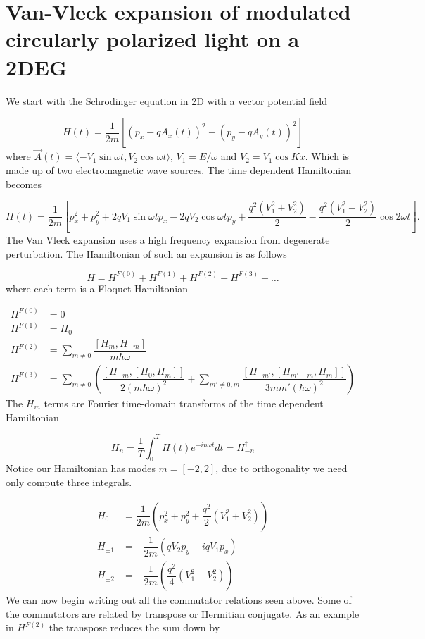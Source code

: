 \section{Van-Vleck expansion of modulated circularly polarized light on a 2DEG}

We start with the Schrodinger equation in 2D with a vector potential field

\begin{equation}
  H(t) = \dfrac{1}{2m} \left[ (p_x - qA_x(t))^2 + (p_y - qA_y(t))^2 \right]
\end{equation}
where $\vec{A}(t) = \langle -V_1\sin{\omega t} , V_2\cos{\omega t} \rangle$, $V_1 = E/\omega$ and $V_2 = V_1 \cos{Kx}$.
Which is made up of two electromagnetic wave sources.
The time dependent Hamiltonian becomes

\begin{equation}
  H(t) = \dfrac{1}{2m} \left[ p_x^2 + p_y^2 + 2qV_1\sin{\omega t} p_x - 2qV_2\cos{\omega t} p_y + \dfrac{q^2(V_1^2+V_2^2)}{2} -\dfrac{q^2(V_1^2-V_2^2)}{2}\cos{2\omega t} \right].
\end{equation}
The Van Vleck expansion uses a high frequency expansion from degenerate perturbation.
The Hamiltonian of such an expansion is as follows

\begin{equation}
  H = H^{F(0)} + H^{F(1)} + H^{F(2)} + H^{F(3)} + \dots
\end{equation}
where each term is a Floquet Hamiltonian

\begin{align}
  H^{F(0)} &= 0 \\
  H^{F(1)} &= H_0 \\
  H^{F(2)} &= \sum_{m\neq 0} \dfrac{[H_m, H_{-m}]}{m\hbar\omega} \\
  H^{F(3)} &= \sum_{m\neq 0} \left( \dfrac{[H_{-m} , [H_0, H_m]]}{2(m\hbar\omega)^2} + \sum_{m'\neq 0, m} \dfrac{[H_{-m'}, [H_{m'-m}, H_m]]}{3mm'(\hbar\omega)^2} \right)
\end{align}
The $H_m$ terms are Fourier time-domain transforms of the time dependent Hamiltonian

\begin{equation}
  H_n = \dfrac{1}{T} \int_0^T H(t) e^{-in\omega t} dt = H_{-n}^{\dagger}
\end{equation}
Notice our Hamiltonian has modes $m = [-2,2]$, due to orthogonality we need only compute three integrals.

\begin{align}
  H_0 &= \dfrac{1}{2m} \left(p_x^2 + p_y^2 + \dfrac{q^2}{2}(V_1^2+V_2^2) \right) \\
  H_{\pm1} &= -\dfrac{1}{2m} \left( qV_2 p_y \pm iqV_1p_x \right) \\
  H_{\pm2} &= -\dfrac{1}{2m} \left( \dfrac{q^2}{4} (V_1^2 - V_2^2) \right)
\end{align}
We can now begin writing out all the commutator relations seen above.
Some of the commutators are related by transpose or Hermitian conjugate.
As an example in $H^{F(2)}$ the transpose reduces the sum down by

